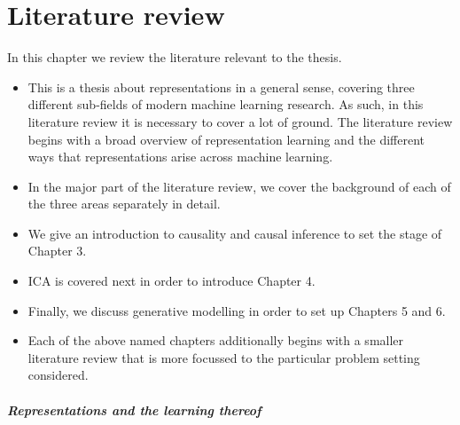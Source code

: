 
\chapter{Literature review}

\ifpdf
    \graphicspath{{Chapter2/Figs/Raster/}{Chapter2/Figs/PDF/}{Chapter2/Figs/}}
\else
    \graphicspath{{Chapter2/Figs/Vector/}{Chapter2/Figs/}}
\fi

In this chapter we review the literature relevant to the thesis.

\begin{itemize}

\item This is a thesis about representations in a general sense, covering three different sub-fields of modern machine learning research. As such, in this literature review it is necessary to cover a lot of ground. The literature review begins with a broad overview of representation learning and the different ways that representations arise across machine learning.
\item In the major part of the literature review, we cover the background of each of the three areas separately in detail.
\item We give an introduction to causality and causal inference to set the stage of Chapter 3.
\item ICA is covered next in order to introduce Chapter 4.
\item Finally, we discuss generative modelling in order to set up Chapters 5 and 6.
\item Each of the above named chapters additionally begins with a smaller literature review that is more focussed to the particular problem setting considered.
\end{itemize}

\paragraph{Representations and the learning thereof}

